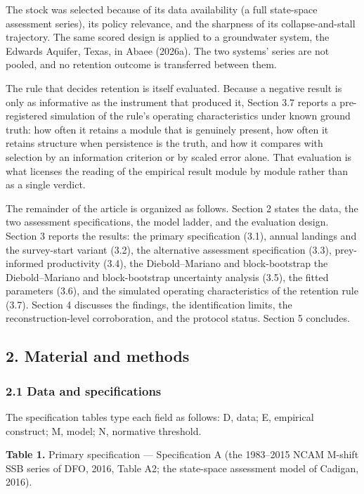 \documentclass[11pt]{article}
\begin{document}
The stock was selected because of its data availability (a full
state-space assessment series), its policy relevance, and the sharpness
of its collapse-and-stall trajectory. The same scored design is applied to a groundwater system, the Edwards
Aquifer, Texas, in Abaee (2026a). The two systems' series are not
pooled, and no retention outcome is transferred between them.

The rule that decides retention is itself evaluated. Because a negative
result is only as informative as the instrument that produced it,
Section 3.7 reports a pre-registered simulation of the rule's operating
characteristics under known ground truth: how often it retains a module
that is genuinely present, how often it retains structure when
persistence is the truth, and how it compares with selection by an
information criterion or by scaled error alone. That evaluation is what
licenses the reading of the empirical result module by module rather
than as a single verdict.

The remainder of the article is organized as follows. Section 2 states
the data, the two assessment specifications, the model ladder, and the
evaluation design. Section 3 reports the results: the primary
specification (3.1), annual landings and the survey-start variant (3.2),
the alternative assessment specification (3.3), prey-informed
productivity (3.4), the Diebold--Mariano and block-bootstrap
the Diebold--Mariano and block-bootstrap uncertainty analysis (3.5),
the fitted parameters (3.6), and the simulated operating characteristics
of the retention rule (3.7).
Section 4 discusses the findings, the identification limits, the
reconstruction-level corroboration, and the protocol status.
Section 5 concludes.

\subsection{2. Material and methods}\label{material-and-methods}

\subsubsection{2.1 Data and
specifications}\label{data-and-specifications}

The specification tables type each field as follows: D, data; E,
empirical construct; M, model; N, normative threshold.

\textbf{Table 1.} Primary specification --- Specification A (the
1983--2015 NCAM M-shift SSB series of DFO, 2016, Table A2; the
state-space assessment model of Cadigan, 2016).
\end{document}

